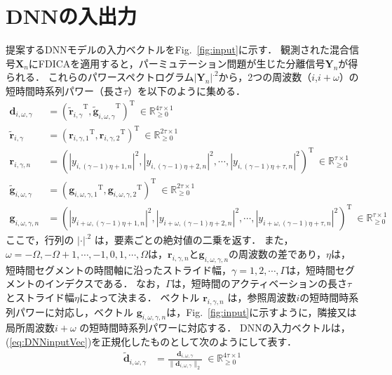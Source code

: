 \section{DNNの入出力}
\label{sec:in-out}

提案するDNNモデルの入力ベクトルをFig.~\ref{fig:input}に示す．
観測された混合信号$\bm{X}_n$にFDICAを適用すると，パーミュテーション問題が生じた分離信号$\bm{Y}_n$が得られる．
これらのパワースペクトログラム$|\bm{Y}_n|^{.2}$から，2つの周波数（$i$,$i+\omega$）の短時間時系列パワー（長さ$\tau$）を以下のように集める．
\begin{align}
\bm{d}_{i, \omega, \gamma} &= ({\tilde{\bm{r}}_{i, \gamma}}^\mathrm{T}, {\tilde{\bm{g}}_{i, \omega, \gamma}}^\mathrm{T} )^\mathrm{T}~\in \mathbb{R}_{\geq 0}^{4\tau \times 1} \label{eq:DNNinputVec}\\
\tilde{\bm{r}}_{i,\gamma} &= ({\bm{r}_{i, \gamma, 1}}^\mathrm{T}, {\bm{r}_{i, \gamma, 2}}^\mathrm{T} )^\mathrm{T}~\in \mathbb{R}_{\geq 0}^{2\tau \times 1} \label{eq:DNNinputVecRtilde}\\
\bm{r}_{i, \gamma, n} &= ( |y_{i, (\gamma-1) \eta+1, n}|^2, |y_{i, (\gamma-1) \eta+2, n} |^2, 
\cdots, |y_{i, (\gamma-1) \eta+\tau, n}|^2 )^\mathrm{T}~\in \mathbb{R}_{\geq 0}^{\tau \times 1}  \label{tau1}\\
\tilde{\bm{g}}_{i,\omega,\gamma} &= ({\bm{g}_{i, \omega, \gamma, 1}}^\mathrm{T}, {\bm{g}_{i, \omega, \gamma, 2}}^\mathrm{T} )^\mathrm{T}~\in \mathbb{R}_{\geq 0}^{2\tau \times 1} \label{eq:DNNinputVecGtilde}\\
\bm{g}_{i,\omega, \gamma, n} &= ( |y_{i+\omega, (\gamma-1) \eta+1, n}|^2, |y_{i+\omega, (\gamma-1) \eta+2, n}|^2,\cdots, |y_{i+\omega, (\gamma-1) \eta+\tau, n}|^2 )^\mathrm{T}~\in \mathbb{R}_{\geq 0}^{\tau \times 1} \label{tau2}
\end{align}
ここで，行列の $|\cdot|^{.2}$ は，要素ごとの絶対値の二乗を返す．
また，$\omega=-\Omega, -\Omega+1, \cdots, -1, 0, 1, \cdots, \Omega$は，$\bm{r}_{i,\gamma,n}$と$\bm{g}_{i,\omega,\gamma,n}$の周波数の差であり，$\eta$は，短時間セグメントの時間軸に沿ったストライド幅，$\gamma=1, 2, \cdots, \Gamma$は，短時間セグメントのインデクスである．
なお，$\Gamma$は，短時間のアクティベーションの長さ$\tau$ とストライド幅$\eta$によって決まる．
ベクトル $\bm{r}_{i,\gamma,n}$ は，参照周波数$i$の短時間時系列パワーに対応し，ベクトル $\bm{g}_{i,\omega,\gamma,n}$は，Fig.~\ref{fig:input}に示すように，隣接又は局所周波数$i+\omega$ の短時間時系列パワーに対応する．
DNNの入力ベクトルは，(\ref{eq:DNNinputVec})を正規化したものとして次のようにして表す．
\begin{align}
\tilde{\bm{d}}_{i, \omega, \gamma} &=\frac{\bm{d}_{i, \omega, \gamma} }{ \|{\bm{d}_{i, \omega, \gamma} }\|_2}~\in \mathbb{R}_{\geq 0}^{4\tau \times 1}  \label{eq:input}
\end{align}

